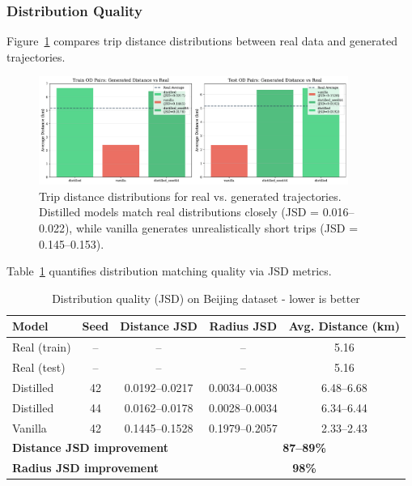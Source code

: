 \subsubsection{Distribution Quality}

Figure~\ref{fig:distance-distributions} compares trip distance distributions between real data and generated trajectories.

\begin{figure}[h]
\centering
\includegraphics[width=0.9\textwidth]{assets/plots/hoser/distance_distributions.pdf}
\caption{Trip distance distributions for real vs. generated trajectories. Distilled models match real distributions closely (JSD = 0.016--0.022), while vanilla generates unrealistically short trips (JSD = 0.145--0.153).}
\label{fig:distance-distributions}
\end{figure}

Table~\ref{tab:jsd-results} quantifies distribution matching quality via JSD metrics.

\begin{table}[h]
\centering
\caption{Distribution quality (JSD) on Beijing dataset - lower is better}
\label{tab:jsd-results}
\small
\begin{tabular}{lcccc}
\toprule
\textbf{Model} & \textbf{Seed} & \textbf{Distance JSD} & \textbf{Radius JSD} & \textbf{Avg. Distance (km)} \\
\midrule
Real (train) & -- & -- & -- & 5.16 \\
Real (test) & -- & -- & -- & 5.16 \\
\midrule
Distilled & 42 & 0.0192--0.0217 & 0.0034--0.0038 & 6.48--6.68 \\
Distilled & 44 & 0.0162--0.0178 & 0.0028--0.0034 & 6.34--6.44 \\
Vanilla & 42 & 0.1445--0.1528 & 0.1979--0.2057 & 2.33--2.43 \\
\midrule
\multicolumn{3}{l}{\textbf{Distance JSD improvement}} & \multicolumn{2}{c}{\textbf{87--89\%}} \\
\multicolumn{3}{l}{\textbf{Radius JSD improvement}} & \multicolumn{2}{c}{\textbf{98\%}} \\
\bottomrule
\end{tabular}
\end{table}

